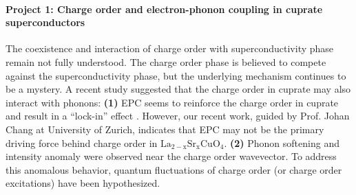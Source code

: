 \documentclass[11pt]{article}
\begin{document}
\paragraph{Project 1: Charge order and electron-phonon coupling in cuprate superconductors}
The coexistence and interaction of charge order with superconductivity phase remain not fully understood. 
The charge order phase is believed to compete against the superconductivity phase\cite{arpaia_charge_2021,comin_resonant_2016,canosa_resonant_2014, hucker_competing_2014, chang_direct_2012,ghiringhelli_long-range_2012}, but the underlying mechanism continues to be a mystery. 
A recent study suggested that the charge order in cuprate may also interact with phonons: \textbf{(1)} EPC seems to reinforce the charge order in cuprate and result in a ``lock-in'' effect \cite{wang_charge_2021}. However, our recent work, guided by Prof. Johan Chang at University of Zurich, indicates that EPC may not be the primary driving force behind charge order in $\mathrm{La_{2-x}Sr_xCuO_4}$. \textbf{(2)} Phonon softening and intensity anomaly were observed near the charge order wavevector\cite{wang_charge_2021,lee_spectroscopic_2021, huang_quantum_2021,lin_strongly_2020,li_multiorbital_2020,braicovich_determining_2020,peng_enhanced_2020, miao_incommensurate_2018,chaix_dispersive_2017,tacon_inelastic_2014}. 
To address this anomalous behavior, quantum fluctuations of charge order (or charge order excitations) have been hypothesized\cite{huang_quantum_2021,lee_spectroscopic_2021}.  
\end{document}

